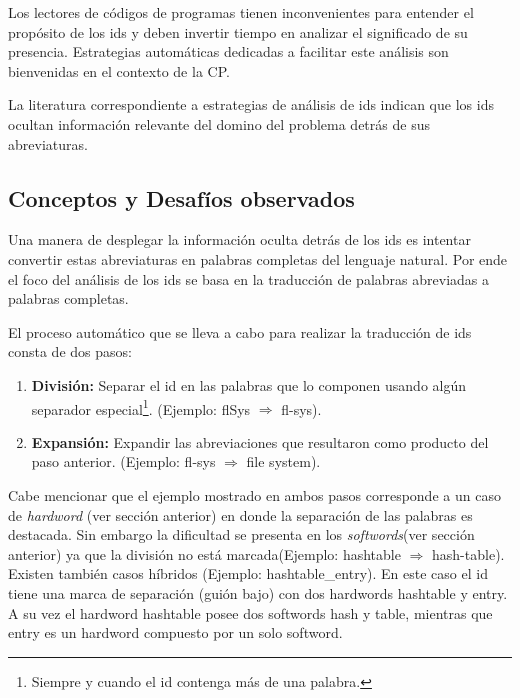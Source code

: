 \documentclass[a4paper,12pt]{report}
\begin{document}
Los lectores de códigos de programas tienen inconvenientes para entender el propósito de los ids y deben invertir tiempo en analizar el significado de su presencia. Estrategias automáticas dedicadas a facilitar este análisis son bienvenidas en el contexto de la CP.

La literatura correspondiente a estrategias de análisis de ids indican que los ids ocultan información relevante del domino del problema detrás de sus abreviaturas\cite{EHPV09,LFBEX07}. 

\subsection{Conceptos y Desafíos observados}

Una manera de desplegar la información oculta detrás de los ids es intentar convertir estas abreviaturas en palabras completas del lenguaje natural. Por ende el foco del análisis de los ids se basa en la traducción de palabras abreviadas a palabras completas.

El proceso automático que se lleva a cabo para realizar la traducción de ids consta de dos pasos\cite{LFBEX07}:

\begin{enumerate}
\itemsep0em%
\item \textbf{División:} Separar el id en las palabras que lo componen usando algún separador especial\footnote[1]{Siempre y cuando el id contenga más de una palabra.}. (Ejemplo: \textsf{flSys} $\Rightarrow$ \textsf{fl-sys}).

\item \textbf{Expansión:} Expandir las abreviaciones que resultaron como producto del paso anterior. (Ejemplo: \textsf{fl-sys} $\Rightarrow$ \textsf{file system}).
\end{enumerate}

Cabe mencionar que el ejemplo mostrado en ambos pasos corresponde a un caso de \textit{hardword} (ver sección anterior) en donde la separación de las palabras es destacada. Sin embargo la dificultad se presenta en los \textit{softwords}(ver sección anterior) ya que la división no está marcada(Ejemplo: \textsf{hashtable} $\Rightarrow$ \textsf{hash-table}). Existen también casos híbridos (Ejemplo: \textsf{hashtable\_entry}). En este caso el id tiene una marca de separación (guión bajo) con dos hardwords \textsf{hashtable} y \textsf{entry}. A su vez el hardword \textsf{hashtable} posee dos softwords \textsf{hash} y \textsf{table}, mientras que \textsf{entry} es un hardword compuesto por un solo softword. 
\end{document}
